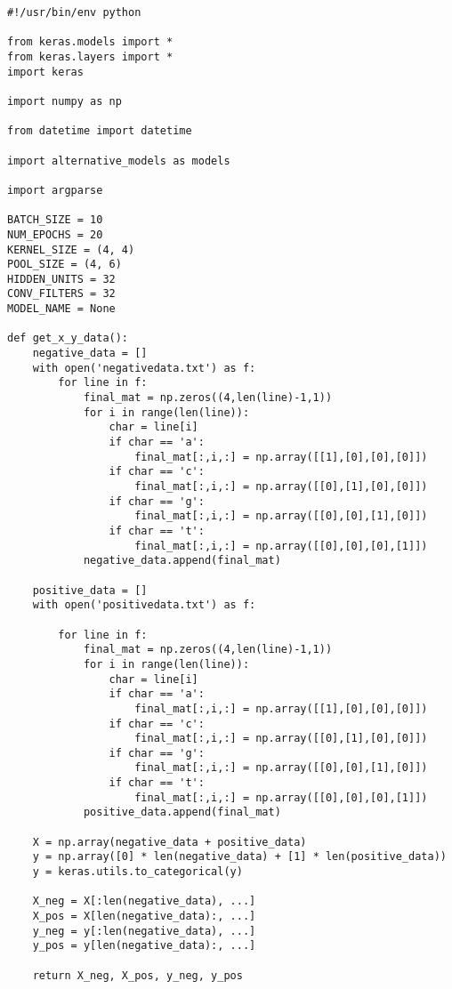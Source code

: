 \documentclass{article}[11pt]
\begin{document}
\begin{verbatim}
#!/usr/bin/env python

from keras.models import *
from keras.layers import *
import keras

import numpy as np

from datetime import datetime

import alternative_models as models

import argparse

BATCH_SIZE = 10
NUM_EPOCHS = 20
KERNEL_SIZE = (4, 4)
POOL_SIZE = (4, 6)
HIDDEN_UNITS = 32
CONV_FILTERS = 32
MODEL_NAME = None

def get_x_y_data():
    negative_data = []
    with open('negativedata.txt') as f:
        for line in f:
            final_mat = np.zeros((4,len(line)-1,1))
            for i in range(len(line)):
                char = line[i]
                if char == 'a':
                    final_mat[:,i,:] = np.array([[1],[0],[0],[0]])
                if char == 'c':
                    final_mat[:,i,:] = np.array([[0],[1],[0],[0]])
                if char == 'g':
                    final_mat[:,i,:] = np.array([[0],[0],[1],[0]])
                if char == 't':
                    final_mat[:,i,:] = np.array([[0],[0],[0],[1]])
            negative_data.append(final_mat)

    positive_data = []
    with open('positivedata.txt') as f:

        for line in f:
            final_mat = np.zeros((4,len(line)-1,1))
            for i in range(len(line)):
                char = line[i]
                if char == 'a':
                    final_mat[:,i,:] = np.array([[1],[0],[0],[0]])
                if char == 'c':
                    final_mat[:,i,:] = np.array([[0],[1],[0],[0]])
                if char == 'g':
                    final_mat[:,i,:] = np.array([[0],[0],[1],[0]])
                if char == 't':
                    final_mat[:,i,:] = np.array([[0],[0],[0],[1]])
            positive_data.append(final_mat)

    X = np.array(negative_data + positive_data)
    y = np.array([0] * len(negative_data) + [1] * len(positive_data))
    y = keras.utils.to_categorical(y)

    X_neg = X[:len(negative_data), ...]
    X_pos = X[len(negative_data):, ...]
    y_neg = y[:len(negative_data), ...]
    y_pos = y[len(negative_data):, ...]

    return X_neg, X_pos, y_neg, y_pos


\end{verbatim}
\end{document}
